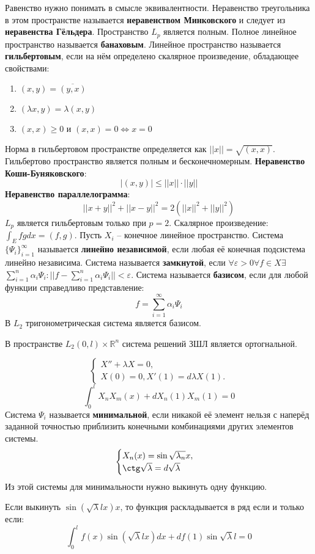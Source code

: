 \documentclass[11pt]{article}
\newcounter{th}\setcounter{th}{0}
\begin{document}
Равенство нужно понимать в смысле эквивалентности. Неравенство треугольника в этом пространстве
называется \textbf{неравенством Минковского} и следует из \textbf{неравенства Гёльдера}.
Пространство $L_p$ является полным.
Полное линейное пространство называется \textbf{банаховым}. Линейное пространство называется
\textbf{гильбертовым}, если на нём определено скалярное произведение, обладающее свойствами:
\begin{enumerate}
\item $(x, y) = \overline{(y, x)}$
\item $(\lambda x, y) = \lambda(x, y)$
\item $(x, x) \geq 0 \text{ и } (x, x) = 0 \Leftrightarrow x = 0$
\end{enumerate}
Норма в гильбертовом пространстве определяется как $||x|| = \sqrt{(x, x)}$. Гильбертово
пространство является полным и бесконечномерным.
\textbf{Неравенство Коши-Буняковского}:
\begin{equation}
|(x, y)| \leq ||x||\cdot||y||
\end{equation}
\textbf{Неравенство параллелограмма}:
\begin{equation}
||x + y||^2 + ||x - y||^2 = 2(||x||^2 + ||y||^2)
\end{equation}
$L_p$ является гильбертовым только при $p = 2$. Скалярное произведение: $\int_Efgdx = (f, g)$.
Пусть $X_i$ -- конечное линейное пространство. Система $\{\Psi_i\}^{\infty}_{i = 1}$ называется
\textbf{линейно независимой}, если любая её конечная подсистема линейно независима. Система
называется \textbf{замкнутой}, если $\forall \varepsilon > 0 \forall f \in X \exists$
$\sum_{i = 1}^n\alpha_i\Psi_i: ||f - \sum_{i = 1}^n\alpha_i\Psi_i|| < \varepsilon$. Система
называется \textbf{базисом}, если для любой функции справедливо представление:
\begin{equation}
f = \sum_{i = 1}^{\infty}\alpha_i\Psi_i
\end{equation}
В $L_2$ тригонометрическая система является базисом.

В пространстве $L_2(0, l)\times\mathbb{R}^n$ система решений ЗШЛ является ортогнальной.

\begin{equation}
\begin{cases}
X'' + \lambda X = 0, \\
X(0) = 0, X'(1) = d\lambda X(1).
\end{cases}
\end{equation}
\begin{equation}
\int_0^lX_nX_m(x) + dX_n(1)X_m(1) = 0
\end{equation}
Система $\Psi_i$ называется \textbf{минимальной}, если никакой её элемент нельзя с наперёд
заданной точностью приблизить конечными комбинациями других элементов системы.
\begin{equation}
\begin{cases}
X_n(x) = \sin\sqrt{\lambda_n}x, \\
\ctg\sqrt{\lambda} = d\sqrt{\lambda}
\end{cases}
\end{equation}
Из этой системы для минимальности нужно выкинуть одну функцию.

Если выкинуть $\sin(\sqrt{\lambda} lx)x$, то функция раскладывается в ряд если и только если:
\begin{equation}
\int_0^lf(x)\sin(\sqrt{\lambda}lx)dx + df(1)\sin\sqrt{\lambda}l = 0
\end{equation}
\end{document}
